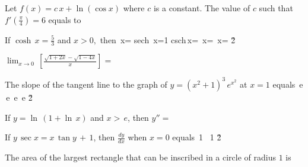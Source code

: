 \documentclass[amsfonts,bezier,leqno,fleqn,12pt,a4paper]{article}
\begin{document}
{\begin{large}
\item %
Let $f(x)=c\,x+\ln(\cos x)$ where $c$ is a constant. The value of $c$ such that $f'(\displaystyle \frac{\pi}{4})=6$ equals to
\sc
{}
\ee
{}
\ee
{}
\ee
{}
\ee
{}
\ee

\newpage



\item %
If $\displaystyle \cosh\,x=\frac{5}{3}$ and $x>0,$ then
\sc
\be
\displaystyle \coth\,x=
\ee
\be
\displaystyle \mbox{sech}\, x=1
\ee
\be
\displaystyle \mbox{csch}\,x=
\ee
\be
\displaystyle \tanh\,x=
\ee
\be
\displaystyle \sinh\,x=
\ee
\v2



\item %
$\displaystyle \lim_{x\rightarrow 0}\, \left[ \frac{\sqrt{1+2x}-\sqrt{1-4x}}{x}\right]=$
\sc
{}
\ee
{}
\ee
{}
\ee
{}
\ee
{}
\ee

\newpage



\item %
The slope of the tangent line to the graph of $y=(x^2+1)^3\,e^{x^2}$ at $x=1$ equals
\sc
{}\,e
\ee
{}\,e
\ee
{}
\ee
{}\,e
\ee
{}\,e
\ee
\v2



\item %
If $\displaystyle y=\ln\,(1+\ln\,x)$ and $x>\,e$, then $y''=$
\sc
\be
\displaystyle {}
\ee
\be
\displaystyle {}
\ee
\be
\displaystyle {}
\ee
\be
\displaystyle {}
\ee
\be
\displaystyle {}
\ee

\newpage



\item %
If $y\,\sec x=x\, \tan y \,+\, 1$, then $\displaystyle {\frac{dy}{dx}}$ when $x=0$ equals
\sc
\be
\displaystyle {}
\ee
\be
\displaystyle \tan\,1
\ee
{}
\ee
\be
\displaystyle \sec\, 1
\ee
\be
\displaystyle {}
\ee
\v2



\item %
The area of the largest rectangle that can be inscribed in a circle of radius $1$ is
\sc
{}\,\pi
\ee
{}
\ee
\be
{}\,
\ee
{}
\ee
\be
\displaystyle {}
\ee

\newpage




\end{large}}
\end{document}
